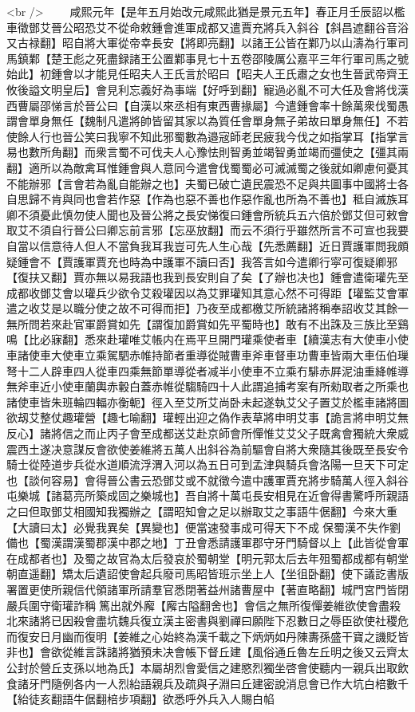 <br />
　　咸熙元年【是年五月始改元咸熙此猶是景元五年】春正月壬辰詔以檻車徵鄧艾晉公昭恐艾不從命敕鍾會進軍成都又遣賈充將兵入斜谷【斜昌遮翻谷音浴又古禄翻】昭自將大軍從帝幸長安【將即亮翻】以諸王公皆在鄴乃以山濤為行軍司馬鎮鄴【楚王彪之死盡録諸王公置鄴事見七十五卷邵陵厲公嘉平三年行軍司馬之號始此】初鍾會以才能見任昭夫人王氏言於昭曰【昭夫人王氏肅之女也生晉武帝齊王攸後謚文明皇后】會見利忘義好為事端【好呼到翻】寵過必亂不可大任及會將伐漢西曹屬邵悌言於晉公曰【自漢以來丞相有東西曹掾屬】今遣鍾會率十餘萬衆伐蜀愚謂會單身無任【魏制凡遣將帥皆留其家以為質任會單身無子弟故曰單身無任】不若使餘人行也晉公笑曰我寧不知此邪蜀數為邉宼師老民疲我今伐之如指掌耳【指掌言易也數所角翻】而衆言蜀不可伐夫人心豫怯則智勇並竭智勇並竭而彊使之【彊其兩翻】適所以為敵禽耳惟鍾會與人意同今遣會伐蜀蜀必可滅滅蜀之後就如卿慮何憂其不能辦邪【言會若為亂自能辦之也】夫蜀已破亡遺民震恐不足與共圖事中國將士各自思歸不肯與同也會若作惡【作為也惡不善也作惡作亂也所為不善也】秪自滅族耳卿不須憂此慎勿使人聞也及晉公將之長安悌復曰鍾會所統兵五六倍於鄧艾但可敕會取艾不須自行晉公曰卿忘前言邪【忘巫放翻】而云不須行乎雖然所言不可宣也我要自當以信意待人但人不當負我耳我豈可先人生心哉【先悉薦翻】近日賈護軍問我頗疑鍾會不【賈護軍賈充也時為中護軍不讀曰否】我答言如今遣卿行寜可復疑卿邪【復扶又翻】賈亦無以易我語也我到長安則自了矣【了辦也决也】鍾會遣衛瓘先至成都收鄧艾會以瓘兵少欲令艾殺瓘因以為艾罪瓘知其意心然不可得距【瓘監艾會軍遣之收艾是以職分使之故不可得而拒】乃夜至成都檄艾所統諸將稱奉詔收艾其餘一無所問若來赴官軍爵賞如先【謂復加爵賞如先平蜀時也】敢有不出誅及三族比至鷄鳴【比必寐翻】悉來赴瓘唯艾帳内在焉平旦開門瓘乘使者車【續漢志有大使車小使車諸使車大使車立乘駕駟赤帷持節者重導從賊曹車斧車督車功曹車皆兩大車伍伯璅弩十二人辟車四人從車四乘無節單導從者减半小使車不立乘冇騑赤屛泥油重絳帷導無斧車近小使車蘭輿赤轂白蓋赤帷從騶騎四十人此謂追捕考案有所勑取者之所乘也諸使車皆朱班輪四輻亦衡軛】徑入至艾所艾尚卧未起遂執艾父子置艾於檻車諸將圖欲刼艾整仗趣瓘營【趣七喻翻】瓘輕出迎之偽作表草將申明艾事【詭言將申明艾無反心】諸將信之而止丙子會至成都送艾赴京師會所憚惟艾艾父子既禽會獨統大衆威震西土遂决意謀反會欲使姜維將五萬人出斜谷為前驅會自將大衆隨其後既至長安令騎士從陸道步兵從水道順流浮渭入河以為五日可到孟津與騎兵會洛陽一旦天下可定也【談何容易】會得晉公書云恐鄧艾或不就徵今遣中護軍賈充將步騎萬人徑入斜谷屯樂城【諸葛亮所築成固之樂城也】吾自將十萬屯長安相見在近會得書驚呼所親語之曰但取鄧艾相國知我獨辦之【謂昭知會之足以辦取艾之事語牛倨翻】今來大重【大讀曰太】必覺我異矣【異變也】便當速發事成可得天下不成保蜀漢不失作劉備也【蜀漢謂漢蜀郡漢中郡之地】丁丑會悉請護軍郡守牙門騎督以上【此皆從會軍在成都者也】及蜀之故官為太后發哀於蜀朝堂【明元郭太后去年殂蜀都成都有朝堂朝直遥翻】矯太后遺詔使會起兵廢司馬昭皆班示坐上人【坐徂卧翻】使下議訖書版署置更使所親信代領諸軍所請羣官悉閉著益州諸曹屋中【著直略翻】城門宮門皆閉嚴兵圍守衛瓘詐稱篤出就外廨【廨古隘翻舍也】會信之無所復憚姜維欲使會盡殺北來諸將已因殺會盡坑魏兵復立漢主密書與劉禪曰願陛下忍數日之辱臣欲使社稷危而復安日月幽而復明【姜維之心始終為漢千載之下炳炳如丹陳夀孫盛干寶之譏貶皆非也】會欲從維言誅諸將猶預未决會帳下督丘建【風俗通丘魯左丘明之後又云齊太公封於營丘支孫以地為氏】本屬胡烈會愛信之建愍烈獨坐啓會使聽内一親兵出取飲食諸牙門隨例各内一人烈紿語親兵及疏與子淵曰丘建密說消息會已作大坑白棓數千【紿徒亥翻語牛倨翻棓步項翻】欲悉呼外兵入人賜白㡊